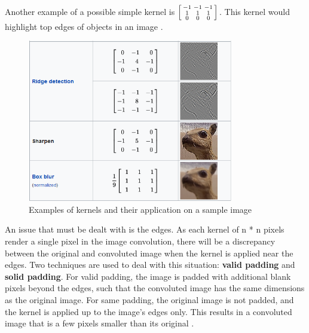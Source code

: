 \documentclass[12pt,a4paper,notitlepage]{article}
\begin{document}
Another example of a possible simple kernel is \(\begin{bsmallmatrix}-1 & -1 & -1 \\ 1 & 1 & 1 \\ 0 & 0 & 0\end{bsmallmatrix}\). This kernel would highlight top edges of objects in an image \cite{deep_lizard_convolutional_2017}.

\begin{figure}[htbp]
	\centering
		\includegraphics[width=0.8\textwidth]{images/image-convolutions-examples.png}
	\caption{Examples of kernels and their application on a sample image \cite{wikipedia_collaborators_kernel_2022}}
	\label{fig:image-convolutions-examples}
\end{figure}

An issue that must be dealt with is the edges. As each kernel of n * n pixels render a single pixel in the image convolution, there will be a discrepancy between the original and convoluted image when the kernel is applied near the edges. Two techniques are used to deal with this situation: \textbf{valid padding} and \textbf{solid padding}. For valid padding, the image is padded with additional blank pixels beyond the edges, such that the convoluted image has the same dimensions as the original image. For same padding, the original image is not padded, and the kernel is applied up to the image's edges only. This results in a convoluted image that is a few pixels smaller than its original \cite{sanderson_convolutions_2020}.
\end{document}
